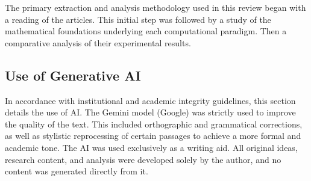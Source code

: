 The primary extraction and analysis methodology used in this review began with a reading of the articles. This initial step was followed by a study of the mathematical foundations underlying each computational paradigm. Then a comparative analysis of their experimental results.

\subsection{Use of Generative AI}

In accordance with institutional and academic integrity guidelines, this section details the use of AI. The Gemini model (Google) was strictly used to improve the quality of the text. This included orthographic and grammatical corrections, as well as stylistic reprocessing of certain passages to achieve a more formal and academic tone. The AI was used exclusively as a writing aid. All original ideas, research content, and analysis were developed solely by the author, and no content was generated directly from it.